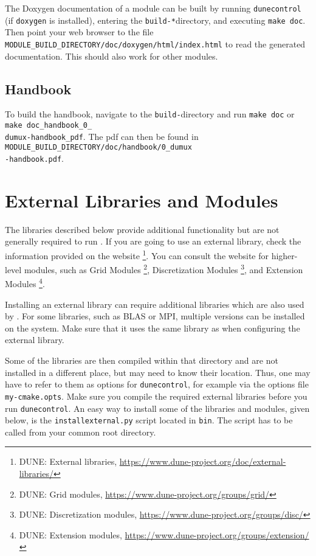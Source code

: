 The Doxygen documentation of a module can be built by running \texttt{dunecontrol} (if \texttt{doxygen} is installed), entering the \texttt{build-*}directory, and executing
\texttt{make doc}. Then point your web browser to the file
\texttt{MODULE\_BUILD\_DIRECTORY/doc/doxygen/html/index.html} to read the generated documentation.
This should also work for other \Dune modules.

\subsection{Handbook}
To build the \Dumux handbook, navigate to the \texttt{build-}directory and
run \texttt{make doc} or \texttt{make doc\_handbook\_0\_\\dumux-handbook\_pdf}. The pdf can then be found
in \texttt{MODULE\_BUILD\_DIRECTORY/doc/handbook/0\_dumux\\-handbook.pdf}.

\section{External Libraries and Modules} \label{sec:external-modules-libraries}
The libraries described below provide additional functionality but are not generally required to run \Dumux.
If you are going to use an external library, check the information provided on the \Dune website%
\footnote{DUNE: External libraries, \url{https://www.dune-project.org/doc/external-libraries/}}. You can consult the \Dune website for higher-level \Dune modules, such as Grid Modules
\footnote{DUNE: Grid modules, \url{https://www.dune-project.org/groups/grid/}},
Discretization Modules
\footnote{DUNE: Discretization modules, \url{https://www.dune-project.org/groups/disc/}},
 and Extension Modules
\footnote{DUNE: Extension modules, \url{https://www.dune-project.org/groups/extension/}}.

Installing an external library can require additional libraries which are also used by \Dune.
For some libraries, such as BLAS or MPI, multiple versions can be installed on the system.
Make sure that it uses the same library as \Dune when configuring the external library.

Some of the libraries are then compiled within that directory and are not installed in
a different place, but \Dune may need to know their location. Thus, one may have to refer to
them as options for \texttt{dunecontrol}, for example via the options file \texttt{my-cmake.opts}.
Make sure you compile the required external libraries before you run \texttt{dunecontrol}.
An easy way to install some of the libraries and modules, given below, is the \texttt{installexternal.py} script located in \texttt{bin}. The script has to be called from your common root directory.


